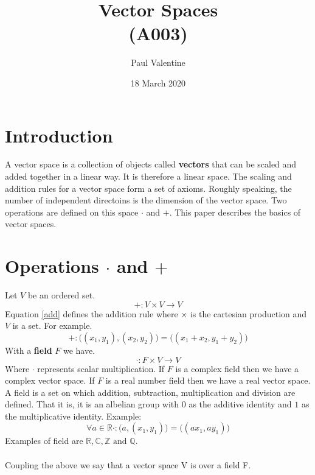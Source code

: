 \documentclass[a4paper]{article}
\title{\textbf{Vector Spaces}\\(A003)}
\author{Paul Valentine}
\date{18 March 2020}
\begin{document}
\maketitle
\section{Introduction}
A vector space is a collection of objects called \textbf{vectors} that can be scaled and added together in a linear way. It is therefore a linear space. The scaling and addition rules for a vector space form a set of axioms. Roughly speaking, the number of independent directoins is the dimension of the vector space. Two operations are defined on this space $\cdot$ and $+$. This paper describes the basics of vector spaces.
\section{Operations $\cdot$ and $+$}
Let $V$ be an ordered set.
\label{operations}
\begin{equation}
  \label{add}
  +:V \times V \to V
\end{equation}
Equation \ref{add} defines the addition rule where $\times$ is the cartesian production\cite{A002} and $V$ is a set. For example.
\begin{equation}
  +:\big((x_1, y_1),(x_2,y_2)\big) = \big((x_1+x_2,y_1+y_2)\big)
\end{equation}
 With a \textbf{field}\cite{wiki:mathfield} $F$ we have.
\begin{equation}
  \cdot : F \times V \to V
\end{equation}
Where $\cdot$ represents scalar multiplication. If $F$ is a complex field then we have a complex vector space. If $F$ is a real number field then we have a real vector space. A field is a set on which addition, subtraction, multiplication and division are defined. That it is, it is an albelian group with $0$ as the additive identity and $1$ as the multiplicative identity. Example:
\begin{equation}
\forall a\in \mathbb{R}  \cdot:\big(a,(x_1,y_1)\big) = \big((ax_1,ay_1)\big)
\end{equation}
Examples of field are $\mathbb{R}, \mathbb{C}, \mathbb{Z} \text{ and } \mathbb{Q}$.\\ \\
Coupling the above we say that a vector space V is over a field F.
\end{document}
